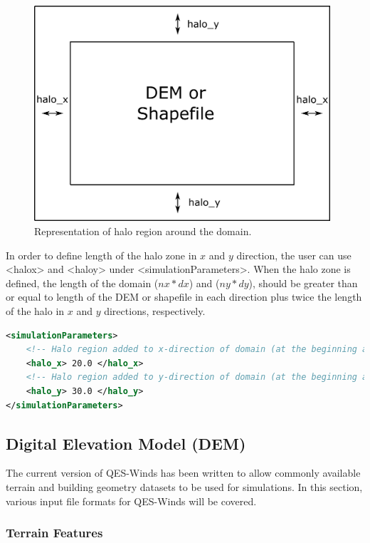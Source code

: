 \begin{figure}[h!]
\centering
\includegraphics[width=11.0cm,keepaspectratio]{Images/domain_halo.png}
\caption{Representation of halo region around the domain.}
\end{figure}

In order to define length of the halo zone in $x$ and $y$ direction, the user can use <halo\textunderscore x> and <halo\textunderscore y> under <simulationParameters>. When the halo zone is defined, the length of the domain ($nx*dx$) and ($ny*dy$), should be greater than or equal to length of the DEM or shapefile in each direction plus twice the length of the halo in $x$ and $y$ directions, respectively.

\begin{lstlisting}[language=XML]
<simulationParameters>
	<!-- Halo region added to x-direction of domain (at the beginning and the end of domain) (meters)-->
	<halo_x> 20.0 </halo_x>
	<!-- Halo region added to y-direction of domain (at the beginning and the end of domain) (meters)-->
	<halo_y> 30.0 </halo_y>						
</simulationParameters>
\end{lstlisting}


\subsection{Digital Elevation Model (DEM)}

The current version of QES-Winds has been written to allow commonly available terrain and building geometry datasets to be used for simulations. In this section, various input file formats for QES-Winds will be covered.

\subsubsection{Terrain Features}

